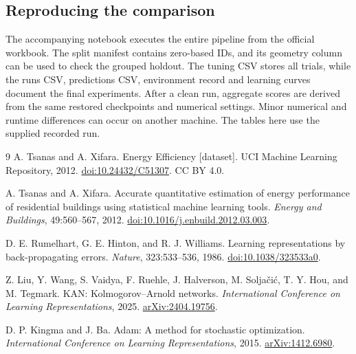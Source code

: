 \documentclass[11pt,twocolumn,letterpaper]{article}
\begin{document}
\subsection{Reproducing the comparison}
The accompanying notebook executes the entire pipeline from the official workbook. The split manifest contains zero-based IDs, and its geometry column can be used to check the grouped holdout. The tuning CSV stores all trials, while the runs CSV, predictions CSV, environment record and learning curves document the final experiments. After a clean run, aggregate scores are derived from the same restored checkpoints and numerical settings. Minor numerical and runtime differences can occur on another machine. The tables here use the supplied recorded run.

\renewcommand{\refname}{References}
\begin{thebibliography}{9}
A. Tsanas and A. Xifara.
\newblock Energy Efficiency [dataset].
\newblock UCI Machine Learning Repository, 2012.
\newblock \href{https://doi.org/10.24432/C51307}{doi:10.24432/C51307}. CC BY 4.0.

A. Tsanas and A. Xifara.
\newblock Accurate quantitative estimation of energy performance of residential buildings using statistical machine learning tools.
\newblock \emph{Energy and Buildings}, 49:560--567, 2012.
\newblock \href{https://doi.org/10.1016/j.enbuild.2012.03.003}{doi:10.1016/j.enbuild.2012.03.003}.

D. E. Rumelhart, G. E. Hinton, and R. J. Williams.
\newblock Learning representations by back-propagating errors.
\newblock \emph{Nature}, 323:533--536, 1986.
\newblock \href{https://doi.org/10.1038/323533a0}{doi:10.1038/323533a0}.

Z. Liu, Y. Wang, S. Vaidya, F. Ruehle, J. Halverson, M. Solja\v{c}i\'c, T. Y. Hou, and M. Tegmark.
\newblock KAN: Kolmogorov--Arnold networks.
\newblock \emph{International Conference on Learning Representations}, 2025.
\newblock \href{https://arxiv.org/abs/2404.19756}{arXiv:2404.19756}.

D. P. Kingma and J. Ba.
\newblock Adam: A method for stochastic optimization.
\newblock \emph{International Conference on Learning Representations}, 2015.
\newblock \href{https://arxiv.org/abs/1412.6980}{arXiv:1412.6980}.
\end{thebibliography}
\end{document}

